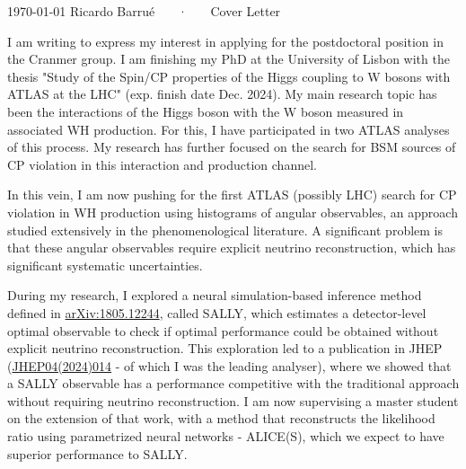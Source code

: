 \documentclass[11pt, a4paper]{awesome-cv}
\begin{document}
\makecvheader[R]

\makecvfooter
  {\today}
  {Ricardo Barrué ~~~·~~~ Cover Letter}
  {}

\makelettertitle

\begin{cvletter}

I am writing to express my interest in applying for the postdoctoral position in the Cranmer group. I am finishing my PhD at the University of Lisbon with the thesis "Study of the Spin/CP properties of the Higgs coupling to W bosons with ATLAS at the LHC" (exp. finish date Dec. 2024). My main research topic has been the interactions of the Higgs boson with the W boson measured in associated WH production. For this, I have participated in two ATLAS analyses of this process. My research has further focused on the search for BSM sources of CP violation in this interaction and production channel. 

In this vein, I am now pushing for the first ATLAS (possibly LHC) search for CP violation in WH production using histograms of angular observables, an approach studied extensively in the phenomenological literature. A significant problem is that these angular observables require explicit neutrino reconstruction, which has significant systematic uncertainties. 

During my research, I explored a neural simulation-based inference method defined in \href{http://dx.doi.org/10.1073/pnas.1915980117}{arXiv:1805.12244}, called SALLY, which estimates a detector-level optimal observable to check if optimal performance could be obtained without explicit neutrino reconstruction. This exploration led to a publication in JHEP (\href{http://dx.doi.org/10.1007/JHEP04(2024)014}{JHEP04(2024)014} - of which I was the leading analyser), where we showed that a SALLY observable has a performance competitive with the traditional approach without requiring neutrino reconstruction. I am now supervising a master student on the extension of that work, with a method that reconstructs the likelihood ratio using parametrized neural networks - ALICE(S), which we expect to have superior performance to SALLY.


\end{cvletter}
\end{document}
